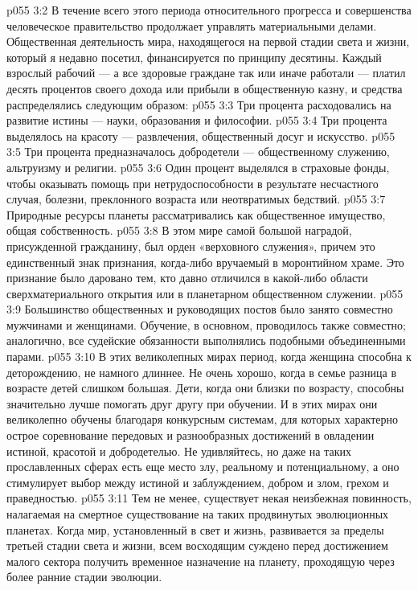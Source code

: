 \vs p055 3:2 \pc В течение всего этого периода относительного прогресса и совершенства человеческое правительство продолжает управлять материальными делами. Общественная деятельность мира, находящегося на первой стадии света и жизни, который я недавно посетил, финансируется по принципу десятины. Каждый взрослый рабочий --- а все здоровые граждане так или иначе работали --- платил десять процентов своего дохода или прибыли в общественную казну, и средства распределялись следующим образом:
\vs p055 3:3 \bibnobreakspace Три процента расходовались на развитие истины --- науки, образования и философии.
\vs p055 3:4 \pc {}\bibnobreakspace Три процента выделялось на красоту --- развлечения, общественный досуг и искусство.
\vs p055 3:5 \pc {}\bibnobreakspace Три процента предназначалось добродетели --- общественному служению, альтруизму и религии.
\vs p055 3:6 \pc {}\bibnobreakspace Один процент выделялся в страховые фонды, чтобы оказывать помощь при нетрудоспособности в результате несчастного случая, болезни, преклонного возраста или неотвратимых бедствий.
\vs p055 3:7 \pc Природные ресурсы планеты рассматривались как общественное имущество, общая собственность.
\vs p055 3:8 В этом мире самой большой наградой, присужденной гражданину, был орден «верховного служения», причем это единственный знак признания, когда\hyp{}либо вручаемый в моронтийном храме. Это признание было даровано тем, кто давно отличился в какой\hyp{}либо области сверхматериального открытия или в планетарном общественном служении.
\vs p055 3:9 Большинство общественных и руководящих постов было занято совместно мужчинами и женщинами. Обучение, в основном, проводилось также совместно; аналогично, все судейские обязанности выполнялись подобными объединенными парами.
\vs p055 3:10 \pc В этих великолепных мирах период, когда женщина способна к деторождению, не намного длиннее. Не очень хорошо, когда в семье разница в возрасте детей слишком большая. Дети, когда они близки по возрасту, способны значительно лучше помогать друг другу при обучении. И в этих мирах они великолепно обучены благодаря конкурсным системам, для которых характерно острое соревнование передовых и разнообразных достижений в овладении истиной, красотой и добродетелью. Не удивляйтесь, но даже на таких прославленных сферах есть еще место злу, реальному и потенциальному, а оно стимулирует выбор между истиной и заблуждением, добром и злом, грехом и праведностью.
\vs p055 3:11 Тем не менее, существует некая неизбежная повинность, налагаемая на смертное существование на таких продвинутых эволюционных планетах. Когда мир, установленный в свет и жизнь, развивается за пределы третьей стадии света и жизни, всем восходящим суждено перед достижением малого сектора получить временное назначение на планету, проходящую через более ранние стадии эволюции.
